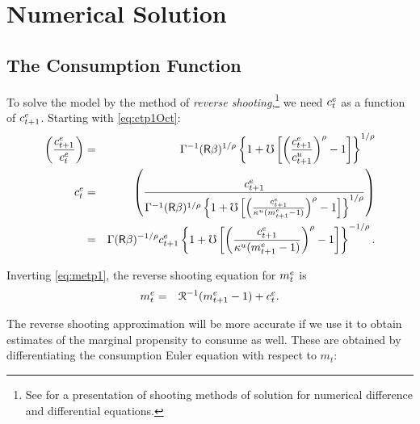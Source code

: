 \message{ !name(TractableBufferStock.tex)}\documentclass{handout}
\begin{document}
\section{Numerical Solution}

\subsection{The Consumption Function}

To solve the model by the method of {\it reverse shooting},\footnote{See \cite{judd:book} for a presentation of shooting methods of solution for numerical difference and differential equations.} we need $c^{e}_{t}$ as a function
of $c^{e}_{t+1}$.  Starting with \eqref{eq:ctp1Oct}:
\begin{eqnarray}
         \left(\frac{c^{e}_{t+1}}{c^{e}_{t}}\right) & = & \Gamma^{-1} (\mathsf{R}\beta)^{1/\rho} \left\{1+\mho\left[\left(\frac{c^{e}_{t+1}}{c^{u}_{t+1}}\right)^{\rho}-1\right]\right\}^{1/\rho}
\\       c^{e}_{t} & = & \left(\frac{c^{e}_{t+1}}{\Gamma^{-1} (\mathsf{R}\beta)^{1/\rho} \left\{1+\mho\left[\left(\frac{c^{e}_{t+1}}{\kappa^{u} (m^{e}_{t+1}-1)}\right)^{\rho}-1\right]\right\}^{1/\rho} }  \right)
\\        & = & \Gamma (\mathsf{R}\beta)^{-1/\rho} c^{e}_{t+1}\left\{1+\mho\left[\left(\frac{c^{e}_{t+1}}{\kappa^{u} (m^{e}_{t+1}-1)}\right)^{\rho}-1\right]\right\}^{-1/\rho}        \label{eq:cReverse}.
\end{eqnarray}

Inverting \eqref{eq:metp1}, the reverse shooting equation for $m^{e}_{t}$ is
\begin{eqnarray}
        m^{e}_{t} & = & \mathcal{R}^{-1} (m^{e}_{t+1}-1)+c^{e}_{t} . \label{eq:mReverse}
\end{eqnarray}

The reverse shooting approximation will be more accurate if we use it to obtain estimates
of the marginal propensity to consume as well.  These are obtained 
by differentiating the consumption Euler equation with respect to $m_{t}$:
\end{document}
